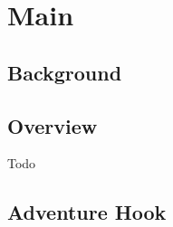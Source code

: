 \section{Main}

\begin{multicols*}{2}
	\subsection*{Background}
	
	
	\subsection*{Overview}
	Todo
	
	\subsection*{Adventure Hook}
	
	
\end{multicols*}